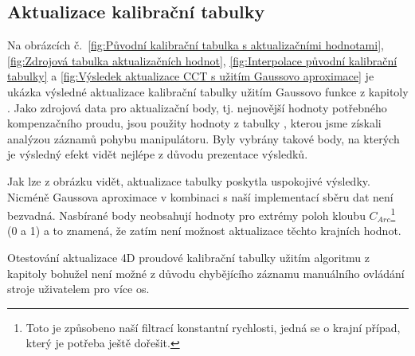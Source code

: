 \subsection{Aktualizace kalibrační tabulky}\label{section:aktualizace CCT}
Na obrázcích č.~\ref{fig:Původní kalibrační tabulka s aktualizačními hodnotami}, \ref{fig:Zdrojová tabulka aktualizačních hodnot}, \ref{fig:Interpolace původní kalibrační tabulky} a \ref{fig:Výsledek aktualizace CCT s užitím Gaussovo aproximace} je ukázka výsledné aktualizace kalibrační tabulky užitím Gaussovo funkce z kapitoly . Jako zdrojová data pro aktualizační body, tj. nejnovější hodnoty potřebného kompenzačního proudu, jsou použity hodnoty z tabulky , kterou jsme získali analýzou záznamů pohybu manipulátoru. Byly vybrány takové body, na kterých je výsledný efekt vidět nejlépe z důvodu prezentace výsledků.
\par
Jak lze z obrázku vidět, aktualizace tabulky poskytla uspokojivé výsledky. Nicméně Gaussova aproximace v kombinaci s naší implementací sběru dat není bezvadná. Nasbírané body neobsahují hodnoty pro extrémy poloh kloubu $C_{Arc}$\footnote{Toto je způsobeno naší filtrací konstantní rychlosti, jedná se o krajní případ, který je potřeba ještě dořešit.} (0 a 1) a to znamená, že zatím není možnost aktualizace těchto krajních hodnot. 
\par
Otestování aktualizace 4D proudové kalibrační tabulky užitím algoritmu z kapitoly  bohužel není možné z důvodu chybějícího záznamu manuálního ovládání stroje uživatelem pro více os.
